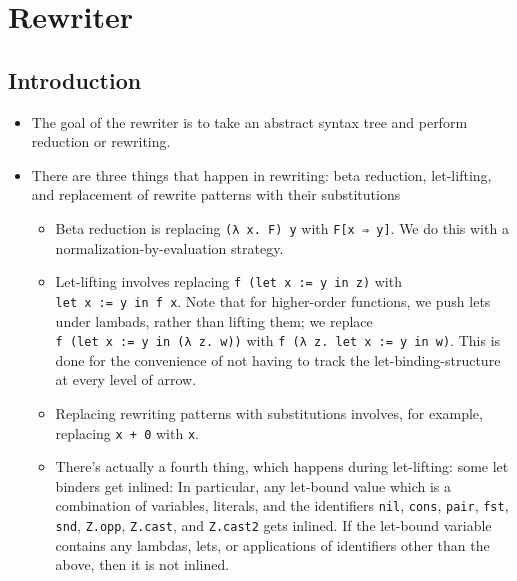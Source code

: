 \documentclass[
]{article}
\author{}
\date{}
\providecommand{\tightlist}{%
  \setlength{\itemsep}{0pt}\setlength{\parskip}{0pt}}
\begin{document}
\hypertarget{rewriter}{%
\section{Rewriter}\label{rewriter}}

\hypertarget{introduction}{%
\subsection{Introduction}\label{introduction}}

\begin{itemize}
\tightlist
\item
  The goal of the rewriter is to take an abstract syntax tree and
  perform reduction or rewriting.
\item
  There are three things that happen in rewriting: beta reduction,
  let-lifting, and replacement of rewrite patterns with their
  substitutions

  \begin{itemize}
  \tightlist
  \item
    Beta reduction is replacing \texttt{(λ\ x.\ F)\ y} with
    \texttt{F{[}x\ ⇒\ y{]}}. We do this with a
    normalization-by-evaluation strategy.
  \item
    Let-lifting involves replacing \texttt{f\ (let\ x\ :=\ y\ in\ z)}
    with \texttt{let\ x\ :=\ y\ in\ f\ x}. Note that for higher-order
    functions, we push lets under lambads, rather than lifting them; we
    replace \texttt{f\ (let\ x\ :=\ y\ in\ (λ\ z.\ w))} with
    \texttt{f\ (λ\ z.\ let\ x\ :=\ y\ in\ w)}. This is done for the
    convenience of not having to track the let-binding-structure at
    every level of arrow.
  \item
    Replacing rewriting patterns with substitutions involves, for
    example, replacing \texttt{x\ +\ 0} with \texttt{x}.
  \item
    There's actually a fourth thing, which happens during let-lifting:
    some let binders get inlined: In particular, any let-bound value
    which is a combination of variables, literals, and the identifiers
    \texttt{nil}, \texttt{cons}, \texttt{pair}, \texttt{fst},
    \texttt{snd}, \texttt{Z.opp}, \texttt{Z.cast}, and \texttt{Z.cast2}
    gets inlined. If the let-bound variable contains any lambdas, lets,
    or applications of identifiers other than the above, then it is not
    inlined.
  \end{itemize}
\end{itemize}
\end{document}

